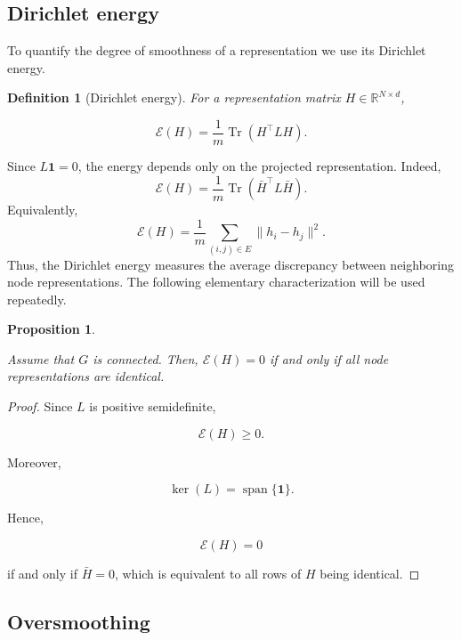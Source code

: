 \documentclass{article}
\newtheorem{proposition}[theorem]{Proposition}
\newtheorem{definition}{Definition}[section]
\DeclareMathOperator{\Tr}{Tr}
\begin{document}
\subsection{Dirichlet energy}

To quantify the degree of smoothness of a representation we use its
Dirichlet energy.

\begin{definition}[Dirichlet energy]	
	For a representation matrix
	$H\in\mathbb{R}^{N\times d}$,
	
	\[
	\mathcal E(H)
	=
	\frac1m
	\operatorname{\Tr}
	(H^{\top}LH).
	\]	
\end{definition}

Since
$
L\mathbf1=0
$, 
the energy depends only on the projected representation.
Indeed,
\[
\mathcal E(H)
=
\frac1m
\operatorname{\Tr}
(\bar H^{\top}L\bar H).
\]
Equivalently,
\[
\mathcal E(H)
=
\frac1m
\sum_{(i,j)\in E}
\|h_i-h_j\|^2.
\]
Thus, the Dirichlet energy measures the average discrepancy between
neighboring node representations.
The following elementary characterization will be used repeatedly.

\begin{proposition}
	\label{prop:energy_zero}
	
	Assume that $G$ is connected.
	Then,
	$
	\mathcal E(H)=0
	$	
	if and only if all node representations are identical.
	
\end{proposition}

\begin{proof}
	
	Since $L$ is positive semidefinite,
	
	\[
	\mathcal E(H)\ge0.
	\]
	
	Moreover,
	
	\[
	\ker(L)
	=
	\operatorname{span}\{\mathbf1\}.
	\]
	
	Hence,
	
	\[
	\mathcal E(H)=0
	\]
	
	if and only if
	$
	\bar H=0$,	
	which is equivalent to all rows of $H$ being identical.	
\end{proof}

\subsection{Oversmoothing}
\end{document}
